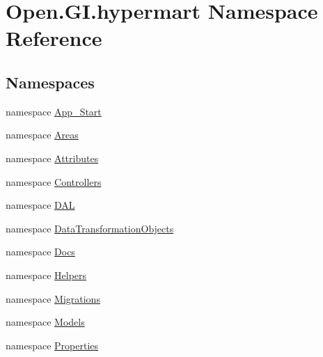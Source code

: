\hypertarget{namespace_open_1_1_g_i_1_1hypermart}{}\section{Open.\+G\+I.\+hypermart Namespace Reference}
\label{namespace_open_1_1_g_i_1_1hypermart}
\subsection*{Namespaces}
\begin{DoxyCompactItemize}
\item 
namespace \hyperlink{namespace_open_1_1_g_i_1_1hypermart_1_1_app___start}{App\+\_\+\+Start}
\item 
namespace \hyperlink{namespace_open_1_1_g_i_1_1hypermart_1_1_areas}{Areas}
\item 
namespace \hyperlink{namespace_open_1_1_g_i_1_1hypermart_1_1_attributes}{Attributes}
\item 
namespace \hyperlink{namespace_open_1_1_g_i_1_1hypermart_1_1_controllers}{Controllers}
\item 
namespace \hyperlink{namespace_open_1_1_g_i_1_1hypermart_1_1_d_a_l}{D\+AL}
\item 
namespace \hyperlink{namespace_open_1_1_g_i_1_1hypermart_1_1_data_transformation_objects}{Data\+Transformation\+Objects}
\item 
namespace \hyperlink{namespace_open_1_1_g_i_1_1hypermart_1_1_docs}{Docs}
\item 
namespace \hyperlink{namespace_open_1_1_g_i_1_1hypermart_1_1_helpers}{Helpers}
\item 
namespace \hyperlink{namespace_open_1_1_g_i_1_1hypermart_1_1_migrations}{Migrations}
\item 
namespace \hyperlink{namespace_open_1_1_g_i_1_1hypermart_1_1_models}{Models}
\item 
namespace \hyperlink{namespace_open_1_1_g_i_1_1hypermart_1_1_properties}{Properties}
\end{DoxyCompactItemize}
